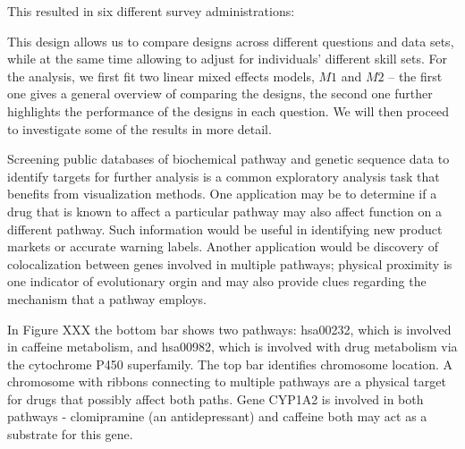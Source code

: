 This resulted in six different survey administrations: 

{
}


\noindent
This design allows us to compare designs across different questions and data sets, while at the same time allowing to adjust for individuals' different skill sets. 
For the analysis, we first fit two linear mixed effects models, $M1$ and $M2$ -- the first one gives a general overview of comparing the designs, the second one further highlights the performance of the designs in each question.
We will then proceed to investigate some of the results in more detail.





Screening public databases of biochemical pathway and genetic sequence data to identify targets for further analysis is a common exploratory analysis task that benefits from visualization methods. One application may be to determine if a drug that is known to affect a particular pathway may also affect function on a different pathway. Such information would be useful in identifying new product markets or accurate warning labels. Another application would be discovery of colocalization between genes involved in multiple pathways; physical proximity is one indicator of evolutionary orgin and may also provide clues regarding the mechanism that a pathway employs.
 
In Figure XXX the bottom bar shows two pathways: hsa00232, which is involved in caffeine metabolism, and hsa00982, which is involved with drug metabolism via the cytochrome P450 superfamily. The top bar identifies chromosome location. A chromosome with ribbons connecting to multiple pathways are a physical target for drugs that possibly affect both paths. Gene CYP1A2 is involved in both pathways - clomipramine (an antidepressant) and caffeine both may act as a substrate for this gene.



